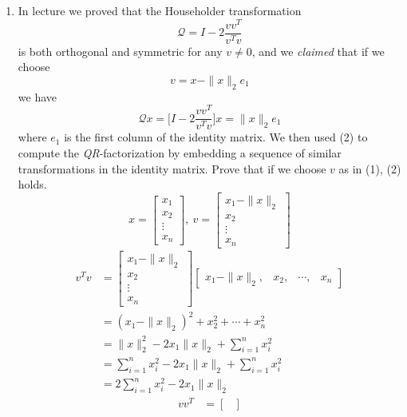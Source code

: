 \documentclass{article}
\newcommand{\twonorm}[1]{\| #1 \|_2}
\begin{document}
\begin{enumerate}
  \item In lecture we proved that the Householder transformation
  \newcommand{\calQ}{\mathcal{Q}}
  \[ \calQ = I - 2 \frac{vv^T}{v^Tv} \]
  is both orthogonal and symmetric for any $v \not = 0$, and we \textit{claimed} that if we choose 
  \begin{equation}
      v = x - \twonorm{x}e_1
  \end{equation}
  we have
  \begin{equation}
      \calQ x = \Bigg[I - 2 \frac{vv^T}{v^Tv} \Bigg] x = \twonorm{x}e_1
  \end{equation}
  where $e_1$ is the first column of the identity matrix. We then used (2) to compute the \textit{QR}-factorization by embedding a sequence of similar transformations in the identity matrix.
  Prove that if we choose $v$ as in (1), (2) holds.
  {
  \everymath{\displaystyle}
  \[
  x = 
  \begin{bmatrix}
    x_1 \\
    x_2 \\
    \vdots \\
    x_n
  \end{bmatrix}
  , \: v = 
  \begin{bmatrix}
    x_1 - \twonorm{x} \\
    x_2 \\
    \vdots \\
    x_n
  \end{bmatrix}
  \]
  \begin{align*} v^Tv &= 
  \begin{bmatrix}
    x_1 - \twonorm{x} \\
    x_2 \\
    \vdots \\
    x_n
  \end{bmatrix}
  \begin{bmatrix}
    x_1 - \twonorm{x}, &
    x_2, &
    \cdots, &
    x_n
  \end{bmatrix} \\
 & =  (x_1 - \twonorm{x})^2 + x_2^2 + \cdots + x_n^2 \\
 & = \twonorm{x}^2 - 2x_1\twonorm{x} + \sum_{i=1}^{n}x_i^2 \\
 & = \sum_{i=1}^{n}x_i^2 - 2x_1\twonorm{x} + \sum_{i=1}^{n}x_i^2 \\
 & =  2\sum_{i=1}^{n}x_i^2 - 2x_1\twonorm{x}
  \end{align*}
  \begin{align*}
     vv^T &= 
    \begin{bmatrix}

\end{bmatrix}
\end{align*}}
\end{enumerate}
\end{document}
